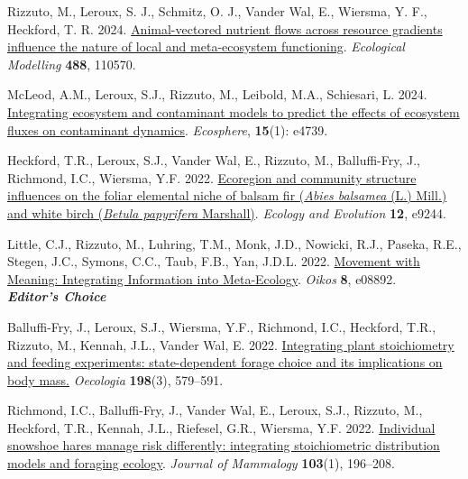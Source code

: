 \begin{etaremune}
  \renewcommand\labelenumi{\bfseries\theenumi .}
  \item \textcolor{awesome}{Rizzuto, M.}, Leroux, S. J., Schmitz, O. J., Vander Wal, E., Wiersma, Y. F., Heckford, T. R. 2024. \href{https://doi.org/10.1016/j.ecolmodel.2023.110570}{Animal-vectored nutrient flows across resource gradients influence the nature of local and meta-ecosystem functioning}. \emph{Ecological Modelling} \textbf{488}, 110570. 
  \item McLeod, A.M., Leroux, S.J., \textcolor{awesome}{Rizzuto, M.}, Leibold, M.A., Schiesari, L. 2024. \href{https://doi.org/10.1002/ecs2.4739}{Integrating ecosystem and contaminant models to predict the effects of ecosystem fluxes on contaminant dynamics}. \emph{Ecosphere}, \textbf{15}(1): e4739.
  \item Heckford, T.R., Leroux, S.J., Vander Wal, E., \textcolor{awesome}{Rizzuto, M.}, Balluffi-Fry, J., Richmond, I.C., Wiersma, Y.F. 2022. \href{https://doi.org/10.1002/ece3.9244}{Ecoregion and community structure influences on the foliar elemental niche of balsam fir (\textit{Abies balsamea} (L.) Mill.) and white birch (\textit{Betula papyrifera} Marshall)}. \emph{Ecology and Evolution} \textbf{12}, e9244. 
  \item Little, C.J.\textsuperscript{\textdagger}, \textcolor{awesome}{Rizzuto, M.}\textsuperscript{\textdagger}, Luhring, T.M., Monk, J.D., Nowicki, R.J., Paseka, R.E., Stegen, J.C., Symons, C.C., Taub, F.B., Yan, J.D.L. 2022. \href{https://doi.org/10.1111/oik.08892}{Movement with Meaning: Integrating Information into Meta-Ecology}. \emph{Oikos} \textbf{8}, e08892.\\ \null\hfill\textbf{\textit{Editor's Choice}}
  \item Balluffi-Fry, J., Leroux, S.J., Wiersma, Y.F., Richmond, I.C., Heckford, T.R., \textcolor{awesome}{Rizzuto, M.}, Kennah, J.L., Vander Wal, E. 2022. \href{https://rdcu.be/cAY5a}{Integrating plant stoichiometry and feeding experiments: state-dependent forage choice and its implications on body mass.} \emph{Oecologia} \textbf{198}(3), 579--591.
  \item Richmond, I.C., Balluffi-Fry, J., Vander Wal, E., Leroux, S.J., \textcolor{awesome}{Rizzuto, M.}, Heckford, T.R., Kennah, J.L., Riefesel, G.R., Wiersma, Y.F. 2022. \href{https://academic.oup.com/jmammal/advance-article/doi/10.1093/jmammal/gyab130/6441781?guestAccessKey=8f89e422-7fb9-4ce9-a9dc-ccf46f3dd0cc}{Individual snowshoe hares manage risk differently: integrating stoichiometric distribution models and foraging ecology}. \emph{Journal of Mammalogy} \textbf{103}(1), 196--208.

\end{etaremune}
